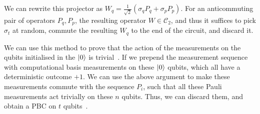 \documentclass{standalone}
\begin{document}
\par
We can rewrite this projector as $W_{q}=\frac{1}{\sqrt{2}}(\sigma_{q}P_{q}+\sigma_{p}P_{p})$. For an anticommuting pair of operators $P_{q},P_{p}$, the resulting operator $W\in\mathcal{C}_{2}$, and thus it suffices to pick $\sigma_{t}$ at random, commute the resulting $W_{q}$ to the end of the circuit, and discard it.
\par
We can use this method to prove that the action of the measurements on the qubits initialised in the $\ket{0}$ is trivial~\cite{Bravyi2015}. If we prepend the measurement sequence with computational basis measurements on these $\ket{0}$ qubits, which all have a deterministic outcome $+1$. We can use the above argument to make these measurements commute with the sequence $P_{i}$, such that all these Pauli measurements act trivially on these $n$ qubits. Thus, we can discard them, and obtain a PBC on $t$ qubits~\cite{Bravyi2015}. 
\end{document}
